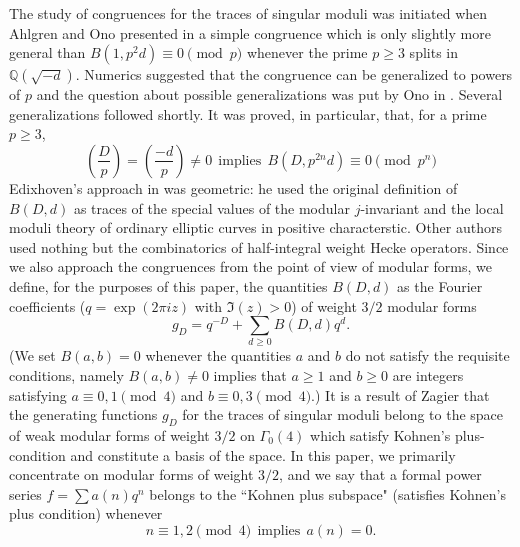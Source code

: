 \documentclass[11pt,letterpaper]{amsart}
\newcommand{\Q}{{\mathbb Q}}
\theoremstyle{remark}
\begin{document}
The study of congruences for the traces of singular moduli was initiated when 
Ahlgren and Ono presented in \cite[Theorem 1.1(1)]{AO} a  simple congruence which is only slightly more general than $B(1,p^{2}d) \equiv 0 \pmod p$ whenever the prime $p \geq 3$ splits in $\Q(\sqrt{-d})$. 
Numerics suggested that the congruence can be generalized to powers of $p$ and the question about possible generalizations was put by Ono in \cite[Problem 7.30]{Ono_book}.
Several generalizations \cite{Edixhoven, Jenkins, Gue730, Ahlgren} followed shortly. 
It was proved, in particular, that, for a prime $p \geq 3$,
\begin{equation} \label{equ_vanishing_old}
\left( \frac{D}{p} \right) = \left( \frac{-d}{p}  \right) \neq 0 ~~ \text{implies} ~~ B(D,p^{2n}d) \equiv 0 \pmod{p^n}
\end{equation}
Edixhoven's approach  in \cite{Edixhoven} was geometric: he used the original definition of $B(D,d)$ as traces of the special values of the modular $j$-invariant  
and the local moduli theory of ordinary elliptic
curves in positive characterstic. Other authors used nothing but the combinatorics of half-integral weight Hecke operators. 
Since we also approach the congruences from the point of view of modular forms, we define, for the purposes of this paper, the quantities $B(D,d)$ as the Fourier coefficients 
($q=\exp(2 \pi i z)$ with $\Im(z)>0$)
of weight $3/2$
modular forms
\[
g_D = q^{-D} + \sum_{d \geq 0} B(D,d) q^d.
\]
(We set $B(a,b)=0$ whenever the quantities $a$ and $b$ do not satisfy the requisite conditions, namely $B(a,b)\neq 0$ implies that $a \geq 1$ and $b \geq 0$ are  integers satisfying $a \equiv 0,1 \pmod 4$ and $b \equiv 0,3 \pmod 4$.)
It is a result of Zagier \cite{Zagier_traces} that the generating functions $g_D$ for the traces of singular moduli belong to the space of  weak modular forms of weight $3/2$ on $\Gamma_0(4)$ 
which satisfy Kohnen's plus-condition and 
constitute a basis of the space. 
In this paper, we primarily concentrate on modular forms of weight $3/2$, and we say that a formal power series 
$ f=\sum a(n)q^n$ belongs to the ``Kohnen  plus subspace" (satisfies Kohnen's plus condition) whenever 
\begin{equation} \label{eq_Kohnen_plus}
n \equiv 1,2 \pmod{4} ~~ \text{implies} ~~ a(n) = 0.
\end{equation}
\end{document}

